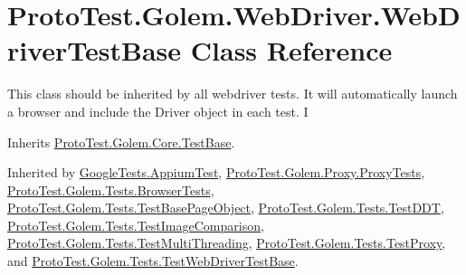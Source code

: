 \hypertarget{class_proto_test_1_1_golem_1_1_web_driver_1_1_web_driver_test_base}{\section{Proto\-Test.\-Golem.\-Web\-Driver.\-Web\-Driver\-Test\-Base Class Reference}
\label{class_proto_test_1_1_golem_1_1_web_driver_1_1_web_driver_test_base}
}


This class should be inherited by all webdriver tests. It will automatically launch a browser and include the Driver object in each test. I  




Inherits \hyperlink{class_proto_test_1_1_golem_1_1_core_1_1_test_base}{Proto\-Test.\-Golem.\-Core.\-Test\-Base}.



Inherited by \hyperlink{class_google_tests_1_1_appium_test}{Google\-Tests.\-Appium\-Test}, \hyperlink{class_proto_test_1_1_golem_1_1_proxy_1_1_proxy_tests}{Proto\-Test.\-Golem.\-Proxy.\-Proxy\-Tests}, \hyperlink{class_proto_test_1_1_golem_1_1_tests_1_1_browser_tests}{Proto\-Test.\-Golem.\-Tests.\-Browser\-Tests}, \hyperlink{class_proto_test_1_1_golem_1_1_tests_1_1_test_base_page_object}{Proto\-Test.\-Golem.\-Tests.\-Test\-Base\-Page\-Object}, \hyperlink{class_proto_test_1_1_golem_1_1_tests_1_1_test_d_d_t}{Proto\-Test.\-Golem.\-Tests.\-Test\-D\-D\-T}, \hyperlink{class_proto_test_1_1_golem_1_1_tests_1_1_test_image_comparison}{Proto\-Test.\-Golem.\-Tests.\-Test\-Image\-Comparison}, \hyperlink{class_proto_test_1_1_golem_1_1_tests_1_1_test_multi_threading}{Proto\-Test.\-Golem.\-Tests.\-Test\-Multi\-Threading}, \hyperlink{class_proto_test_1_1_golem_1_1_tests_1_1_test_proxy}{Proto\-Test.\-Golem.\-Tests.\-Test\-Proxy}, and \hyperlink{class_proto_test_1_1_golem_1_1_tests_1_1_test_web_driver_test_base}{Proto\-Test.\-Golem.\-Tests.\-Test\-Web\-Driver\-Test\-Base}.

